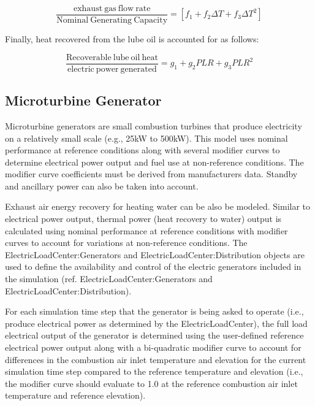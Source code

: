 \begin{equation}
\frac{{{\mathrm{exhaust~gas~flow~rate}}}}{{{\mathrm{Nominal~Generating~Capacity}}}} = \left[ {{f_1} + {f_2}\Delta T + {f_3}\Delta {T^2}} \right]
\end{equation}

Finally, heat recovered from the lube oil is accounted for as follows:

\begin{equation}
\frac{{{\mathrm{Recoverable~lube~oil~heat}}}}{{{\mathrm{electric~power~generated}}}} = {g_1} + {g_2}PLR + {g_3}PL{R^2}
\end{equation}

\subsection{Microturbine Generator}\label{microturbine-generator}

Microturbine generators are small combustion turbines that produce electricity on a relatively small scale (e.g., 25kW to 500kW). This model uses nominal performance at reference conditions along with several modifier curves to determine electrical power output and fuel use at non-reference conditions. The modifier curve coefficients must be derived from manufacturers data. Standby and ancillary power can also be taken into account.

Exhaust air energy recovery for heating water can be also be modeled. Similar to electrical power output, thermal power (heat recovery to water) output is calculated using nominal performance at reference conditions with modifier curves to account for variations at non-reference conditions. The ElectricLoadCenter:Generators and ElectricLoadCenter:Distribution objects are used to define the availability and control of the electric generators included in the simulation (ref. ElectricLoadCenter:Generators and ElectricLoadCenter:Distribution).

For each simulation time step that the generator is being asked to operate (i.e., produce electrical power as determined by the ElectricLoadCenter), the full load electrical output of the generator is determined using the user-defined reference electrical power output along with a bi-quadratic modifier curve to account for differences in the combustion air inlet temperature and elevation for the current simulation time step compared to the reference temperature and elevation (i.e., the modifier curve should evaluate to 1.0 at the reference combustion air inlet temperature and reference elevation).

